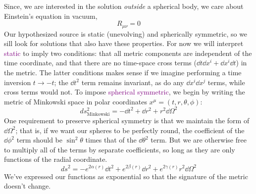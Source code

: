 Since, we are interested in the solution \textit{outside} a spherical body, we care about Einstein's equation in vacuum,
\begin{equation*}
    R_{\mu\nu}=0
\end{equation*}
Our hypothesized source is static (unevolving) and spherically symmetric, so we sill look for solutions that also have these properties. For now we will interpret \textcolor{purple}{static} to imply two conditions: that all metric components are independent of the time coordinate, and that there are no time-space cross terms ($\dd t\dd x^{i}+\dd x^{i}\dd t$) in the metric. The latter conditions makes sense if we imagine performing a time inversion $t\to -t$; the $\dd t^2$ term remains invariant, as do any $\dd x^{i}\dd x^j$ terms, while cross terms would not. To impose \textcolor{purple}{spherical symmetric}, we begin by writing the metric of Minkowski space in polar coordinates $x^\mu=(t,r,\theta,\phi)$:
\begin{equation*}
    ds^2_{\text{Minkowski}}=-\dd t^2+\dd r^2+r^2\dd \Omega^2
\end{equation*}
One requirement to preserve spherical symmetry is that we maintain the form of $\dd\Omega^2$; that is, if we want our spheres to be perfectly round, the coefficient of the $\dd\phi^2$ term should be $\sin^2\theta$ times that of the $\dd\theta^2$ term. But we are otherwise free to multiply all of the terms by separate coefficients, so long as they are only functions of the radial coordinate.
\begin{equation}\label{5.5}
    ds^2=-e^{2\alpha(r)}\dd t^2+e^{2\beta(r)}\dd r^2+e^{2\gamma(r)}r^2\dd\Omega^2
\end{equation}
We've expressed our functions as exponential so that the signature of the metric doesn't change.

